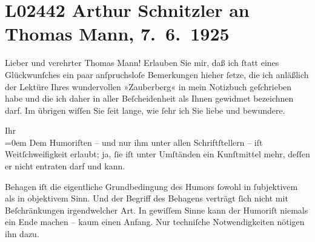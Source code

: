 

\section[Arthur Schnitzler an Thomas Mann, 7. 6. 1925]{L02442 Arthur Schnitzler an Thomas Mann, 7. 6. 1925}
\nopagebreak{}
\rehead{ }\normalsize\beginnumbering{}
\toendnotes[C]{\smallbreak\pagebreak[2]}
\toendnotes[C]{\smallbreak}
\pstart\center{}{\pb}Lieber und verehrter Thomas Mann!\pend\vspace{0.5em}
\pstart
           Erlauben Sie mir, daß ich{ }ſtatt eines Glückwunſches ein paar anſpruchsloſe
               Bemerkungen hieher{ }ſetze, die ich anläßlich der Lektüre Ihres wundervollen »Zauberberg« in mein Notizbuch geſchrieben habe
               und die ich daher in aller Beſcheidenheit als Ihnen gewidmet bezeichnen darf. Im
               übrigen wiſſen Sie{ }ſeit lange, wie{ }ſehr ich Sie liebe und bewundere.\pend
           
\pstart
           Ihr{\\[\baselineskip]}\spacefill\mbox{}\pend
           \leftskip=0em{}
\pstart
           \noindent{}Dem Humoriſten – und nur ihm unter allen Schriftſtellern – iſt Weitſchweifigkeit
                  erlaubt; ja,{ }ſie iſt unter Umſtänden ein Kunſtmittel mehr, deſſen er nicht
                  entraten darf und kann.\pend
           
\pstart
           Behagen iſt die eigentliche Grundbedingung des Humors{ }ſowohl in{ }ſubjektivem als in
                  objektivem Sinn. Und der Begriff des Behagens verträgt{ }ſich nicht mit
                  Beſchränkungen irgendwelcher Art. In gewiſſem Sinne kann der Humoriſt niemals ein
                  Ende machen – kaum einen Anfang. Nur techniſche Notwendigkeiten nötigen ihn
                  dazu.\pend
           
